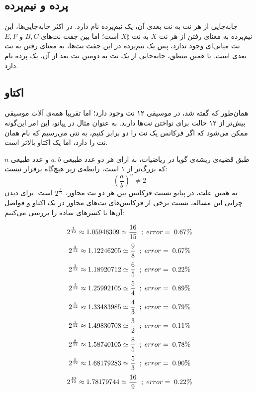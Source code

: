 \subsection{پرده و نیم‌پرده}
جابه‌جایی از هر نت به نت بعدی آن، یک نیم‌پرده نام دارد. در اکثر جابه‌جایی‌ها، این نیم‌پرده به معنای رفتن از هر نت
$X$
به نت
$X\sharp$
است؛ اما بین جفت نت‌های
$B, C$
و
$E, F$
نت میانی‌ای وجود ندارد، پس یک نیم‌پرده در این جفت نت‌ها، به معنای رفتن به نت بعدی است.
با همین منطق، جابه‌جایی از یک نت به دومین نت بعد از آن، یک پرده نام دارد.

\subsection{اکتاو}
همان‌طور که گفته شد، در موسیقی ۱۲ نت وجود دارد؛ اما تقریبا همه‌ی آلات موسیقی بیش‌تر از ۱۲ حالت برای نواختن نت‌ها دارند. به عنوان مثال در پیانو، این امر این‌گونه ممکن می‌شود که اگر فرکانس یک نت را دو برابر کنیم، به نتی می‌رسیم که نام همان نت را دارد، اما یک اکتاو بالاتر است.

طبق قضیه‌ی ریشه‌ی گویا در ریاضیات، به ازای هر دو عدد طبیعی 
$a, b$
و عدد طبیعی
$n$
که بزرگ‌تر از ۱ است، رابطه‌ی زیر هیچ‌گاه برقرار نیست:
\begin{equation}
    (\frac{a}{b})^n \neq 2
\end{equation}
به همین علت، در پیانو نسبت فرکانس بین هر دو نت مجاور، 
$2^{\frac{1}{12}}$
است.
برای دیدن چرایی این مساله، نسبت برخی از فرکانس‌های نت‌های مجاور در یک اکتاو و فواصل آن‌ها با کسرهای ساده را بررسی می‌کنیم:

\begin{equation}
\begin{gathered}
    2^{\frac{1}{12}} \approx 1.05946309 \simeq \frac{16}{15} \hspace{2mm} ; \hspace{1mm} error = \hspace{1mm} 0.67\% \\[3pt]
    2^{\frac{2}{12}} \approx 1.12246205 \simeq \frac{9}{8} \hspace{2mm} ; \hspace{1mm} error = \hspace{1mm} 0.67\% \\[3pt]
    2^{\frac{3}{12}} \approx 1.18920712 \simeq \frac{6}{5} \hspace{2mm} ; \hspace{1mm} error = \hspace{1mm} 0.22\% \\[3pt]
    2^{\frac{4}{12}} \approx 1.25992105 \simeq \frac{5}{4} \hspace{2mm} ; \hspace{1mm} error = \hspace{1mm} 0.89\% \\[3pt]
    2^{\frac{5}{12}} \approx 1.33483985 \simeq \frac{4}{3} \hspace{2mm} ; \hspace{1mm} error = \hspace{1mm} 0.79\% \\[3pt]
    2^{\frac{7}{12}} \approx 1.49830708 \simeq \frac{3}{2} \hspace{2mm} ; \hspace{1mm} error = \hspace{1mm} 0.11\% \\[3pt]
    2^{\frac{8}{12}} \approx 1.58740105 \simeq \frac{8}{5} \hspace{2mm} ; \hspace{1mm} error = \hspace{1mm} 0.78\% \\[3pt]
    2^{\frac{9}{12}} \approx 1.68179283 \simeq \frac{5}{3} \hspace{2mm} ; \hspace{1mm} error = \hspace{1mm} 0.90\% \\[3pt]
    2^{\frac{10}{12}} \approx 1.78179744 \simeq \frac{16}{9} \hspace{2mm} ; \hspace{1mm} error = \hspace{1mm} 0.22\% \\[3pt]
\end{gathered}    
\end{equation}

